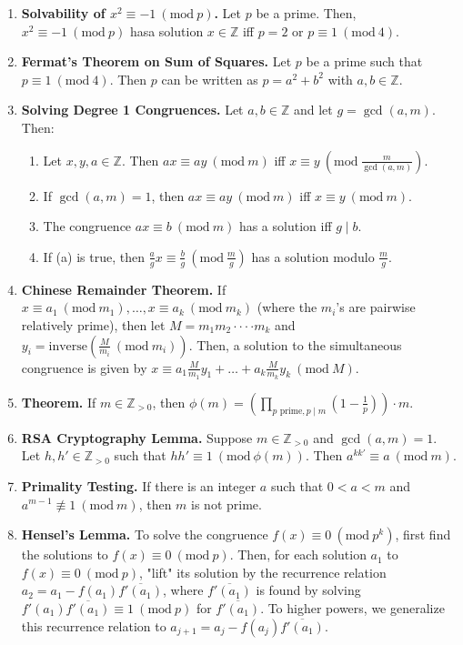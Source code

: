 \documentclass[11pt]{article}
\theoremstyle{definition}
\theoremstyle{named}
\newcommand{\Mod}[1]{\ (\mathrm{mod}\ #1)}
\begin{document}
\begin{enumerate}
    \item \textbf{Solvability of $x^2 \equiv -1 \Mod{p}$. } Let $p$ be a prime. Then, $x^2 \equiv -1 \Mod{p}$ hasa solution $x \in \mathbb{Z}$ iff $p=2$ or $p \equiv 1 \Mod{4}$. 
    \item \textbf{Fermat's Theorem on Sum of Squares. } Let $p$ be a prime such that $p \equiv 1 \Mod{4}$. Then $p$ can be written as $p = a^2 + b^2$ with $a,b \in \mathbb{Z}$. 
    \item \textbf{Solving Degree 1 Congruences. } Let $a,b \in \mathbb{Z}$ and let $g = \gcd(a,m)$. Then: 
    \begin{enumerate}
        \item Let $x,y,a \in \mathbb{Z}$. Then $ax \equiv ay \Mod{m}$ iff $x \equiv y \Mod{\frac{m}{\gcd(a,m)}}$.
        \item If $\gcd(a,m) = 1$, then $ax \equiv ay \Mod{m}$ iff $x \equiv y \Mod{m}$.
        \item The congruence $ax \equiv b \Mod{m}$ has a solution iff $g \mid b$. 
        \item If (a) is true, then $\frac{a}{g}x \equiv \frac{b}{g} \Mod{\frac{m}{g}}$ has a solution modulo $\frac{m}{g}$. 
    \end{enumerate}
    \item \textbf{Chinese Remainder Theorem. } If $x \equiv a_1 \Mod{m_1}, \dots, x \equiv a_k \Mod{m_k}$ (where the $m_i$'s are pairwise relatively prime), then let $M=m_1 m_2\cdot\cdot\cdot\cdot m_k$ and $y_i = \textrm{inverse}\left(\frac{M}{m_i} \Mod{m_i}\right)$. Then, a solution to the simultaneous congruence is given by $x \equiv a_1 \frac{M}{m_1} y_1 + \dots + a_k \frac{M}{m_k} y_k \Mod{M}$.  
    \item \textbf{Theorem. } If $m \in \mathbb{Z}_{>0}$, then $\phi(m) = \left(\prod_{p \textrm{ prime}, p \mid m} (1-\frac{1}{p}) \right)\cdot m$. 
    \item \textbf{RSA Cryptography Lemma. } Suppose $m \in \mathbb{Z}_{>0}$ and $\gcd(a,m) = 1$. Let $h,h' \in \mathbb{Z}_{>0}$ such that $hh' \equiv 1 \Mod{\phi(m)}$. Then $a^{kk'} \equiv a \Mod{m}$. 
    \item \textbf{Primality Testing. } If there is an integer $a$ such that $0 < a < m$ and $a^{m-1} \not\equiv 1 \Mod{m}$, then $m$ is not prime. 
    \item \textbf{Hensel's Lemma. } To solve the congruence $f(x) \equiv 0 \Mod{p^k}$, first find the solutions to $f(x) \equiv 0 \Mod{p}$. Then, for each solution $a_1$ to $f(x) \equiv 0 \Mod{p}$, "lift" its solution by the recurrence relation $a_2 = a_1 - f(a_1)\overline{f'(a_1)}$, where $\overline{f'(a_1)}$ is found by solving $f'(a_1)\overline{f'(a_1)} \equiv 1 \Mod{p}$ for $\overline{f'(a_1)}$. To higher powers, we generalize this recurrence relation to $a_{j+1} = a_j - f(a_j)\overline{f'(a_1)}$.  \\

\end{enumerate}
\end{document}
